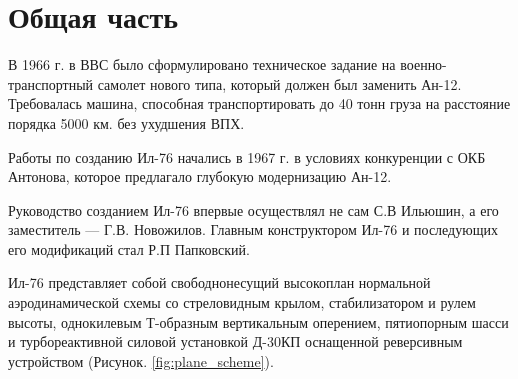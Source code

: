\chapter{Общая часть}
В 1966 г. в ВВС было сформулировано техническое задание на военно-транспортный 
самолет нового типа, который должен был заменить Ан-12. Требовалась машина,
способная транспортировать до 40 тонн груза на расстояние порядка 5000 км. без
ухудшения ВПХ.

Работы по созданию Ил-76 начались в 1967 г. в условиях конкуренции с ОКБ 
Антонова, которое предлагало глубокую модернизацию Ан-12. 

Руководство созданием Ил-76 впервые осуществлял не сам С.В Ильюшин, а его
заместитель --- Г.В. Новожилов. Главным конструктором Ил-76 и последующих его
модификаций стал Р.П Папковский.

Ил-76 представляет собой свободнонесущий высокоплан нормальной аэродинамической
схемы со стреловидным крылом, стабилизатором и рулем высоты, однокилевым
Т-образным вертикальным оперением, пятиопорным шасси и турбореактивной силовой
установкой Д-30КП оснащенной реверсивным устройством (Рисунок. \ref{fig:plane_scheme}). 


\clearpage
\begin{sidewaysfigure}
    \centering
    \caption{Общий вид самолета Ил-76}
    \label{fig:plane_scheme}
\end{sidewaysfigure}
\clearpage





